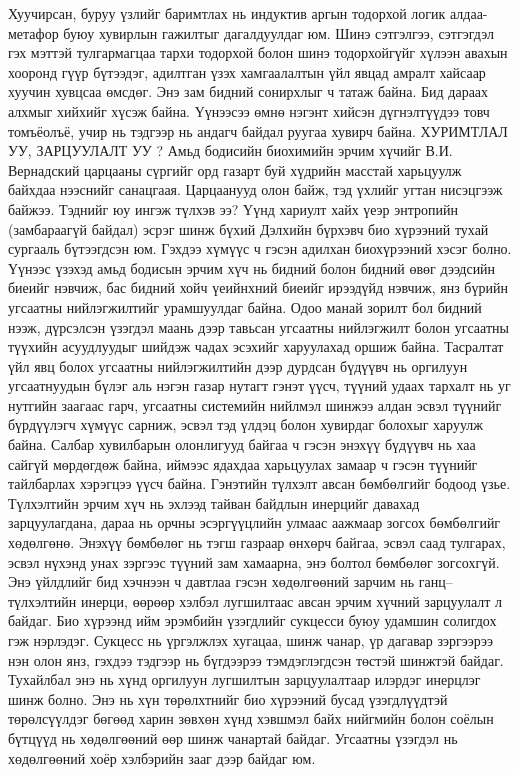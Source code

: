 Хуучирсан, буруу үзлийг баримтлах нь индуктив аргын тодорхой логик алдаа-метафор буюу хувирлын гажилтыг дагалдуулдаг юм. Шинэ сэтгэлгээ, сэтгэгдэл гэх мэттэй тулгармагцаа тархи тодорхой болон шинэ тодорхойгүйг хүлээн авахын хооронд гүүр бүтээдэг, адилтган үзэх хамгаалалтын үйл явцад амралт хайсаар хуучин хувцсаа өмсдөг. Энэ зам бидний сонирхлыг ч татаж байна. Бид дараах алхмыг хийхийг хүсэж байна. Үүнээсээ өмнө нэгэнт хийсэн дүгнэлтүүдээ товч томъёолъё, учир нь тэдгээр нь андагч байдал руугаа хувирч байна.
ХУРИМТЛАЛ УУ, ЗАРЦУУЛАЛТ УУ ?
Амьд бодисийн биохимийн эрчим хүчийг В.И. Вернадский царцааны сүргийг орд газарт буй хүдрийн масстай харьцуулж байхдаа нээснийг санацгаая. Царцаанууд олон байж, тэд үхлийг угтан нисэцгээж байжээ. Тэднийг юу ингэж түлхэв ээ? Үүнд хариулт хайх үеэр энтропийн (замбараагүй байдал) эсрэг шинж бүхий Дэлхийн бүрхэвч био хүрээний тухай сургааль бүтээгдсэн юм. Гэхдээ хүмүүс ч гэсэн адилхан биохүрээний хэсэг болно. Үүнээс үзэхэд амьд бодисын эрчим хүч нь бидний болон бидний өвөг дээдсийн биеийг нэвчиж, бас бидний хойч үеийнхний биеийг ирээдүйд нэвчиж, янз бүрийн угсаатны нийлэгжилтийг урамшуулдаг байна. Одоо манай зорилт бол бидний нээж, дүрсэлсэн үзэгдэл маань дээр тавьсан угсаатны нийлэгжилт болон угсаатны түүхийн асуудлуудыг шийдэж чадах эсэхийг харуулахад оршиж байна.
Тасралтат үйл явц болох угсаатны нийлэгжилтийн дээр дурдсан бүдүүвч нь оргилуун угсаатнуудын бүлэг аль нэгэн газар нутагт гэнэт үүсч, түүний удаах тархалт нь уг нутгийн заагаас гарч, угсаатны системийн нийлмэл шинжээ алдан эсвэл түүнийг бүрдүүлэгч хүмүүс сарниж, эсвэл тэд үлдэц болон хувирдаг болохыг харуулж байна. Салбар хувилбарын олонлигууд байгаа ч гэсэн энэхүү бүдүүвч нь хаа сайгүй мөрдөгдөж байна, иймээс ядахдаа харьцуулах замаар ч гэсэн түүнийг тайлбарлах хэрэгцээ үүсч байна.
Гэнэтийн түлхэлт авсан бөмбөлгийг бодоод үзье. Түлхэлтийн эрчим хүч нь эхлээд тайван байдлын инерцийг давахад зарцуулагдана, дараа нь орчны эсэргүүцлийн улмаас аажмаар зогсох бөмбөлгийг хөдөлгөнө. Энэхүү бөмбөлөг нь тэгш газраар өнхөрч байгаа, эсвэл саад тулгарах, эсвэл нүхэнд унах зэргээс түүний зам хамаарна, энэ болтол бөмбөлөг зогсохгүй. Энэ үйлдлийг бид хэчнээн ч давтлаа гэсэн хөдөлгөөний зарчим нь ганц–түлхэлтийн инерци, өөрөөр хэлбэл лугшилтаас авсан эрчим хүчний зарцуулалт л байдаг.
Био хүрээнд ийм эрэмбийн үзэгдлийг сукцесси буюу удамшин солигдох гэж нэрлэдэг. Сукцесс нь үргэлжлэх хугацаа, шинж чанар, үр дагавар зэргээрээ нэн олон янз, гэхдээ тэдгээр нь бүгдээрээ тэмдэглэгдсэн төстэй шинжтэй байдаг. Тухайлбал энэ нь хүнд оргилуун лугшилтын зарцуулалтаар илэрдэг инерцлэг шинж болно. Энэ нь хүн төрөлхтнийг био хүрээний бусад үзэгдлүүдтэй төрөлсүүлдэг бөгөөд харин зөвхөн хүнд хэвшмэл байх нийгмийн болон соёлын бүтцүүд нь хөдөлгөөний өөр шинж чанартай байдаг. Угсаатны үзэгдэл нь хөдөлгөөний хоёр хэлбэрийн зааг дээр байдаг юм.
